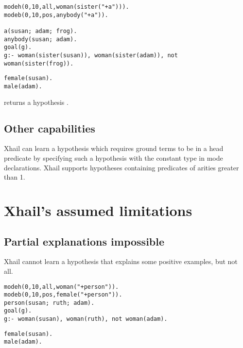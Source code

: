 \begin{minipage}[t]{.60\textwidth}
\begin{lstlisting}
modeh(0,10,all,woman(sister("+a"))).
modeb(0,10,pos,anybody("+a")).

a(susan; adam; frog).
anybody(susan; adam).
goal(g).
g:- woman(sister(susan)), woman(sister(adam)), not woman(sister(frog)).
\end{lstlisting}
\end{minipage}
\begin{minipage}[t]{.20\textwidth}
\begin{lstlisting}
female(susan).
male(adam).
\end{lstlisting}
\end{minipage}

returns a hypothesis
.
\subsection{Other capabilities}
Xhail can learn a hypothesis which requires ground terms to be in a head predicate by specifying such a hypothesis with the constant type  in mode declarations. Xhail supports hypotheses containing predicates of arities greater than 1.

\section{Xhail's assumed limitations}

\subsection{Partial explanations impossible}
Xhail cannot learn a hypothesis that explains some positive examples, but not all.

\begin{minipage}[t]{.60\textwidth}
\begin{lstlisting}
modeh(0,10,all,woman("+person")).
modeb(0,10,pos,female("+person")).
person(susan; ruth; adam).
goal(g).
g:- woman(susan), woman(ruth), not woman(adam).
\end{lstlisting}
\end{minipage}
\begin{minipage}[t]{.20\textwidth}
\begin{lstlisting}
female(susan).
male(adam).
\end{lstlisting}
\end{minipage}

